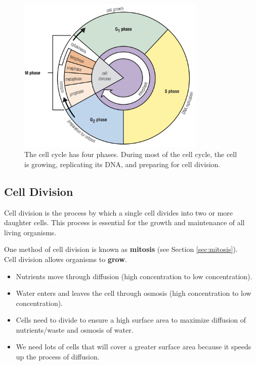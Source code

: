 \documentclass[12pt]{report}
\begin{document}
\begin{figure}[H]
\centering
    \includegraphics[width=0.8\textwidth]{../figures/cell cycle.png}
    \caption{The cell cycle has four phases. During most of the cell cycle, the cell is growing, replicating its DNA, and preparing for cell division.}
    \label{fig:cell-cycle}
\end{figure}

\subsection{Cell Division}
\begin{definition}
    Cell division is the process by which a single cell divides into two or more daughter cells. This process is essential for the growth and maintenance of all living organisms.
\end{definition}

One method of cell division is known as \textbf{mitosis} (see Section \ref{sec:mitosis}).\\

Cell division allows organisms to \textbf{grow}. 
\begin{itemize}
    \item{Nutrients move through diffusion (high concentration to low concentration).}
    \item{Water enters and leaves the cell through osmosis (high concentration to low concentration).}
    \item{Cells need to divide to ensure a high surface area to maximize diffusion of nutrients/waste and osmosis of water.}
    \item{We need lots of cells that will cover a greater surface area because it speeds up the process of diffusion.}
\end{itemize}
\end{document}
